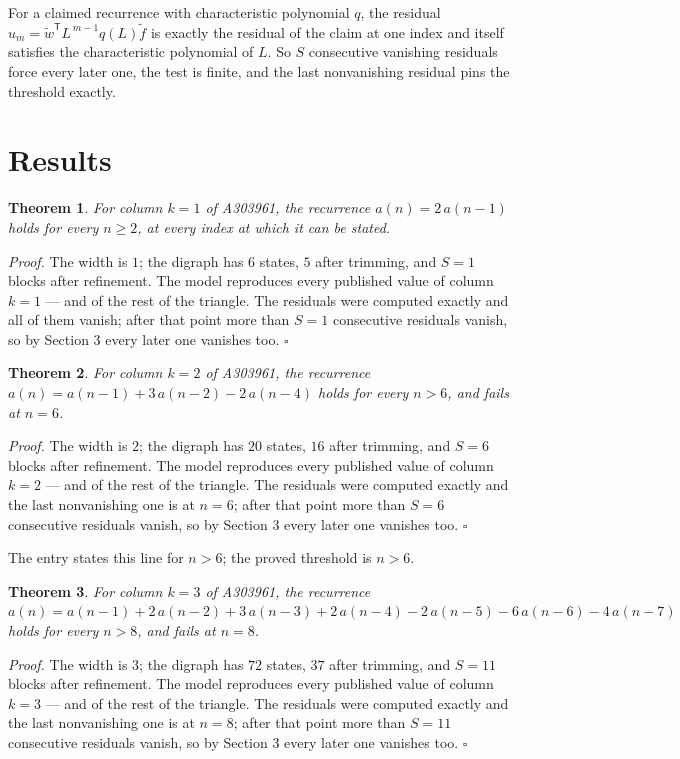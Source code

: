\documentclass[11pt]{article}
\newtheorem{theorem}{Theorem}
\theoremstyle{definition}
\begin{document}
For a claimed recurrence with characteristic polynomial $q$, the residual $u_m = \tilde w^{\mathsf T}L^{\,m-1}q(L)\tilde f$ is exactly the residual of the claim at one index and itself satisfies the characteristic polynomial of $L$. So $S$ consecutive vanishing residuals force every later one, the test is finite, and the last nonvanishing residual pins the threshold exactly.

\section{Results}

\begin{theorem} For column $k = 1$ of A303961, the recurrence $a(n) = 2\,a(n-1)$ holds for every $n \ge 2$, at every index at which it can be stated.\end{theorem}

{\itshape Proof.} The width is $1$; the digraph has $6$ states, $5$ after trimming, and $S = 1$ blocks after refinement. The model reproduces every published value of column $k = 1$ --- and of the rest of the triangle. The residuals were computed exactly and all of them vanish; after that point more than $S = 1$ consecutive residuals vanish, so by Section 3 every later one vanishes too. $\square$

\begin{theorem} For column $k = 2$ of A303961, the recurrence $a(n) = a(n-1) + 3\,a(n-2) - 2\,a(n-4)$ holds for every $n > 6$, and fails at $n = 6$.\end{theorem}

{\itshape Proof.} The width is $2$; the digraph has $20$ states, $16$ after trimming, and $S = 6$ blocks after refinement. The model reproduces every published value of column $k = 2$ --- and of the rest of the triangle. The residuals were computed exactly and the last nonvanishing one is at $n = 6$; after that point more than $S = 6$ consecutive residuals vanish, so by Section 3 every later one vanishes too. $\square$

The entry states this line for $n > 6$; the proved threshold is $n > 6$.

\begin{theorem} For column $k = 3$ of A303961, the recurrence $a(n) = a(n-1) + 2\,a(n-2) + 3\,a(n-3) + 2\,a(n-4) - 2\,a(n-5) - 6\,a(n-6) - 4\,a(n-7)$ holds for every $n > 8$, and fails at $n = 8$.\end{theorem}

{\itshape Proof.} The width is $3$; the digraph has $72$ states, $37$ after trimming, and $S = 11$ blocks after refinement. The model reproduces every published value of column $k = 3$ --- and of the rest of the triangle. The residuals were computed exactly and the last nonvanishing one is at $n = 8$; after that point more than $S = 11$ consecutive residuals vanish, so by Section 3 every later one vanishes too. $\square$
\end{document}
